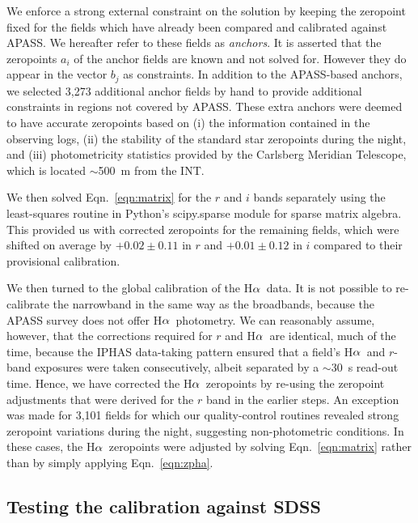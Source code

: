 \documentclass[a4paper,useAMS,usenatbib]{mn2e}
\def\ha{\mbox{H$\rm \alpha$}}
\begin{document}
We enforce a strong external constraint
on the solution by keeping the zeropoint fixed 
for the fields which have already been compared
and calibrated against APASS.
We hereafter refer to these fields as \emph{anchors}.
It is asserted that the zeropoints $a_i$ of the anchor fields 
are known and not solved for.  However they do appear in the vector 
$b_j$ as constraints.  In addition to the APASS-based anchors, 
we selected 3,273 additional anchor fields by hand
to provide additional constraints in regions not covered by APASS.
These extra anchors were deemed to have accurate zeropoints 
based on 
(i) the information contained in the observing logs,
(ii) the stability of the standard star zeropoints during the night, and
(iii) photometricity statistics provided by the Carlsberg Meridian Telescope,
which is located $\sim$500~m from the INT.

We then solved Eqn.~\ref{eqn:matrix} for the $r$ and $i$ bands
separately using the least-squares routine 
in Python's {\sc scipy.sparse} module for sparse matrix algebra.
This provided us with corrected zeropoints for the remaining fields,
which were shifted on average by $+0.02\pm0.11$ in $r$ 
and $+0.01\pm0.12$ in $i$ compared to their provisional calibration.

We then turned to the global calibration of the \ha\ data.
It is not possible to re-calibrate the narrowband 
in the same way as the broadbands,
because the APASS survey does not offer \ha\ photometry.
We can reasonably assume, however,
that the corrections required for $r$ and \ha\ are identical,
much of the time, because the IPHAS data-taking pattern ensured 
that a field's \ha\ and $r$-band exposures
were taken consecutively,
albeit separated by a $\sim$30~s read-out time.
Hence, we have corrected the \ha\ zeropoints 
by re-using the zeropoint adjustments that were derived for the $r$ band
in the earlier steps.
An exception was made for 3,101 fields
for which our quality-control routines revealed
strong zeropoint variations during the night,
suggesting non-photometric conditions.
In these cases, the \ha\ zeropoints
were adjusted by solving Eqn.~\ref{eqn:matrix}
rather than by simply applying Eqn.~\ref{eqn:zpha}.

\subsection{Testing the calibration against SDSS}
\end{document}
